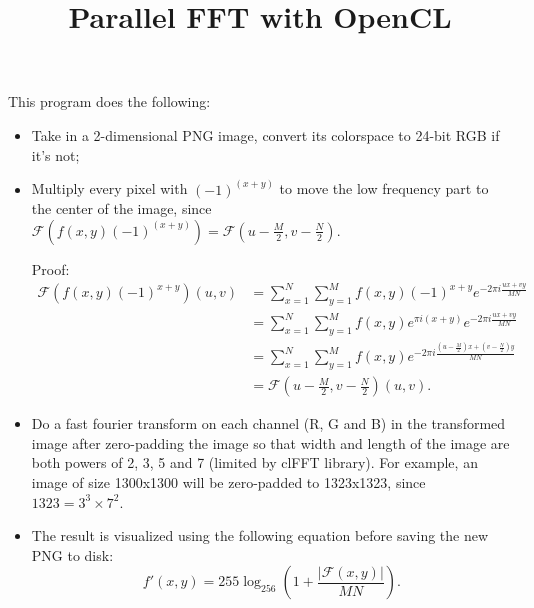 \documentclass{article}
\begin{document}
  \title{Parallel FFT with OpenCL}

  \maketitle

  This program does the following:

  \begin{itemize}
  \item Take in a 2-dimensional PNG image, convert its colorspace to 24-bit RGB if it's not;
  \item Multiply every pixel with $\left(-1\right)^{\left(x + y\right)}$ to move the low frequency part to the center
        of the image, since $ \mathscr{F}\left(f\left(x, y\right) \left(-1\right)^{\left(x + y\right)}\right)
         = \mathscr{F}\left(u - \frac{M}{2}, v - \frac{N}{2}\right) $.

        Proof:
        \begin{equation*}
        \begin{aligned}
        \mathscr{F}\left(f\left(x, y\right) \left(-1\right)^{x + y}\right)\left(u, v\right)
          &= \sum\limits_{x = 1}^N \sum\limits_{y = 1}^M f\left(x, y\right) \left(-1\right)^{x + y}
             e^{-2 \pi i \frac{ux + vy}{MN}} \\
          &= \sum\limits_{x = 1}^N \sum\limits_{y = 1}^M f\left(x, y\right) e^{\pi i \left(x + y\right)}
             e^{-2 \pi i \frac{ux + vy}{MN}} \\
          &= \sum\limits_{x = 1}^N \sum\limits_{y = 1}^M f\left(x, y\right)
             e^{-2 \pi i \frac{\left(u - \frac{M}{2}\right)x + \left(v - \frac{N}{2}\right)y}{MN}} \\
          &= \mathscr{F}\left(u - \frac{M}{2}, v - \frac{N}{2}\right)\left(u, v\right).
        \end{aligned}
        \end{equation*}
  \item Do a fast fourier transform on each channel (R, G and B) in the transformed image after zero-padding the image
        so that width and length of the image are both powers of 2, 3, 5 and 7 (limited by clFFT library). For example,
        an image of size 1300x1300 will be zero-padded to 1323x1323, since $ 1323 = 3^3 \times 7^2 $.
  \item The result is visualized using the following equation before saving the new PNG to disk:
        $$ f'\left(x, y\right) =
            255 \log_{256} \left(1 + \frac{\left|\mathscr{F}\left(x, y\right)\right|}{MN}\right). $$
  \end{itemize}
\end{document}
